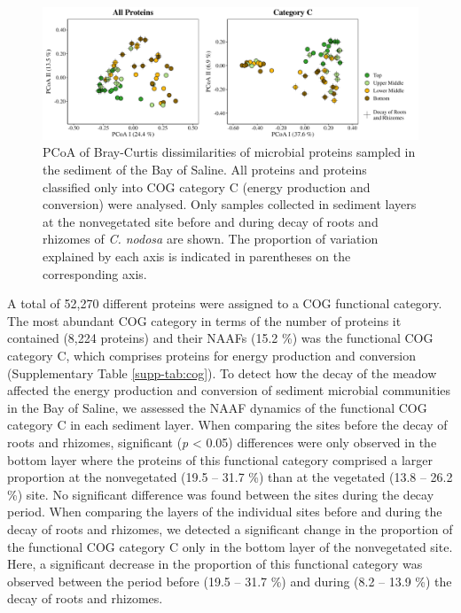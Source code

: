 \documentclass[
  12 pt,
]{article}
\begin{document}
\begin{figure}[H]

{\centering \includegraphics[width=1\linewidth]{../results/figures/pcoa_nonvegetated} 

}

\caption{PCoA of Bray-Curtis dissimilarities of microbial proteins sampled in the sediment of the Bay of Saline. All proteins and proteins classified only into COG category C (energy production and conversion) were analysed. Only samples collected in sediment layers at the nonvegetated site before and during decay of roots and rhizomes of \emph{C. nodosa} are shown. The proportion of variation explained by each axis is indicated in parentheses on the corresponding axis.}\label{fig:pcoa-nonvegetated}
\end{figure}

A total of 52,270 different proteins were assigned to a COG functional category. The most abundant COG category in terms of the number of proteins it contained (8,224 proteins) and their NAAFs (15.2 \si{\percent}) was the functional COG category C, which comprises proteins for energy production and conversion (Supplementary Table \ref{supp-tab:cog}). To detect how the decay of the meadow affected the energy production and conversion of sediment microbial communities in the Bay of Saline, we assessed the NAAF dynamics of the functional COG category C in each sediment layer. When comparing the sites before the decay of roots and rhizomes, significant (\emph{p} \textless{} 0.05) differences were only observed in the bottom layer where the proteins of this functional category comprised a larger proportion at the nonvegetated (19.5 -- 31.7 \si{\percent}) than at the vegetated (13.8 -- 26.2 \si{\percent}) site. No significant difference was found between the sites during the decay period. When comparing the layers of the individual sites before and during the decay of roots and rhizomes, we detected a significant change in the proportion of the functional COG category C only in the bottom layer of the nonvegetated site. Here, a significant decrease in the proportion of this functional category was observed between the period before (19.5 -- 31.7 \si{\percent}) and during (8.2 -- 13.9 \si{\percent}) the decay of roots and rhizomes.
\end{document}
